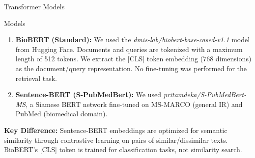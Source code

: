 \documentclass[10pt, french]{beamer}
\begin{document}
\begin{frame}{Transformer Models}
\begin{block}{Models}
     \begin{enumerate}
        \item \textbf{BioBERT (Standard):} We used the
        \textit{dmis-lab/biobert-base-cased-v1.1} model from Hugging Face.
        Documents and queries are tokenized with a maximum length of 512
        tokens. We extract the [CLS] token embedding (768 dimensions) as
        the document/query representation. No fine-tuning was performed
        for the retrieval task.

        \item \textbf{Sentence-BERT (S-PubMedBert):} We used \textit{pritamdeka/S-PubMedBert-MS},
        a Siamese BERT network fine-tuned on MS-MARCO (general IR)
        and PubMed (biomedical domain).
     \end{enumerate}
\end{block}

\vspace{0.3cm}
\textbf{Key Difference:} Sentence-BERT embeddings are optimized for
semantic similarity through contrastive learning on pairs of similar/dissimilar texts. BioBERT's [CLS] token is trained for classification tasks, not similarity search.
\end{frame}
\end{document}
